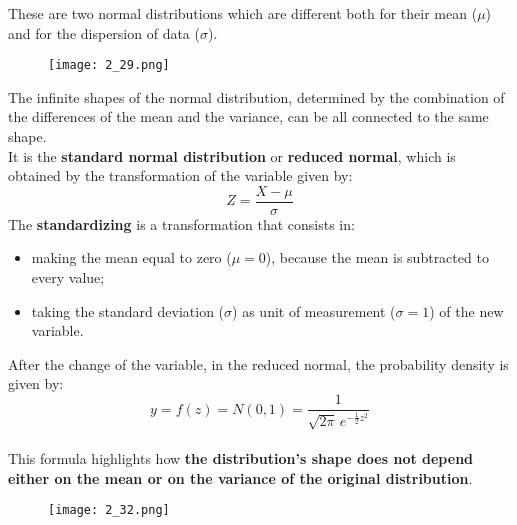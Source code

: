 \begin{frame}
  \vspace*{.25cm}
  These are two normal distributions which are different both for their mean ($ \mu $) and for the dispersion of data ($ \sigma $).
  \begin{figure}
    \texttt{[image: 2\_29.png]}
  \end{figure}
\end{frame}


\begin{frame}
  The infinite shapes of the normal distribution, determined by the combination of the differences of the mean and the variance, can be all connected to the same shape.\\
  \vspace*{.25cm}
  It is the \textbf{standard normal distribution} or \textbf{reduced normal}, which is obtained by the transformation of the variable given by:
  \vspace*{.25cm}
  $$ Z = \frac{X-\mu} {\sigma} $$
  \vspace*{.25cm}
  The \textbf{standardizing} is a transformation that consists in:
  \begin{itemize}
    \item making the mean equal to zero ($ \mu = 0 $), because the mean is subtracted to every value;
    \item taking the standard deviation ($ \sigma $) as unit of measurement ($ \sigma = 1 $) of the new variable.
  \end{itemize}
\end{frame}

\begin{frame}
  \vspace*{.5cm}
  After the change of the variable, in the reduced normal, the probability density is given by:\\
  \vspace*{.25cm}
  $$y = f(z) = N(0,1) = \frac{1}{\sqrt{2\pi}\,e^{-\frac{1}{2}z^2}} $$ \\
  \vspace*{1cm}
  This formula highlights how \textbf{the distribution's shape does not depend either on the mean or on the variance of the original distribution}.
\end{frame}

\begin{frame}
  \begin{figure}
    \texttt{[image: 2\_32.png]}
  \end{figure}
\end{frame}

